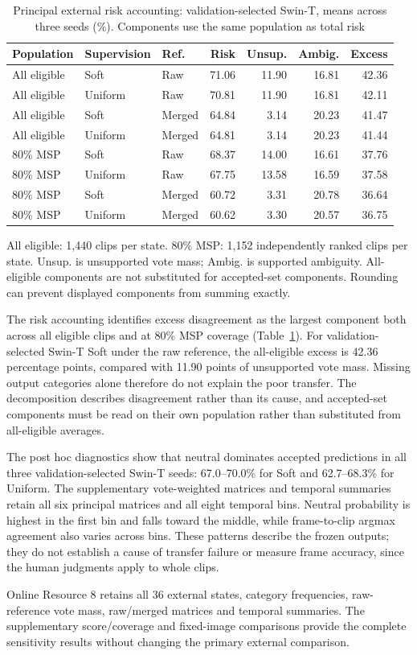 \begin{table}[htbp]
\caption{Principal external risk accounting: validation-selected Swin-T, means across three seeds (\%). Components use the same population as total risk}\label{tab:externalaccounting}
\centering\small\begin{tabular}{lllrrrr}\toprule
Population & Supervision & Ref. & Risk & Unsup. & Ambig. & Excess\\\midrule
All eligible & Soft & Raw & 71.06 & 11.90 & 16.81 & 42.36\\
All eligible & Uniform & Raw & 70.81 & 11.90 & 16.81 & 42.11\\
All eligible & Soft & Merged & 64.84 & 3.14 & 20.23 & 41.47\\
All eligible & Uniform & Merged & 64.81 & 3.14 & 20.23 & 41.44\\
80\% MSP & Soft & Raw & 68.37 & 14.00 & 16.61 & 37.76\\
80\% MSP & Uniform & Raw & 67.75 & 13.58 & 16.59 & 37.58\\
80\% MSP & Soft & Merged & 60.72 & 3.31 & 20.78 & 36.64\\
80\% MSP & Uniform & Merged & 60.62 & 3.30 & 20.57 & 36.75\\
\bottomrule\end{tabular}\par\smallskip
All eligible: 1,440 clips per state. 80\% MSP: 1,152 independently ranked clips per state. Unsup. is unsupported vote mass; Ambig. is supported ambiguity. All-eligible components are not substituted for accepted-set components. Rounding can prevent displayed components from summing exactly.\par
\end{table}

The risk accounting identifies excess disagreement as the largest component both across all eligible clips and at 80\% MSP coverage (Table~\ref{tab:externalaccounting}). For validation-selected Swin-T Soft under the raw reference, the all-eligible excess is 42.36 percentage points, compared with 11.90 points of unsupported vote mass. Missing output categories alone therefore do not explain the poor transfer. The decomposition describes disagreement rather than its cause, and accepted-set components must be read on their own population rather than substituted from all-eligible averages.

The post hoc diagnostics show that neutral dominates accepted predictions in all three validation-selected Swin-T seeds: 67.0--70.0\% for Soft and 62.7--68.3\% for Uniform. The supplementary vote-weighted matrices and temporal summaries retain all six principal matrices and all eight temporal bins. Neutral probability is highest in the first bin and falls toward the middle, while frame-to-clip argmax agreement also varies across bins. These patterns describe the frozen outputs; they do not establish a cause of transfer failure or measure frame accuracy, since the human judgments apply to whole clips.

Online Resource 8 retains all 36 external states, category frequencies, raw-reference vote mass, raw/merged matrices and temporal summaries. The supplementary score/coverage and fixed-image comparisons provide the complete sensitivity results without changing the primary external comparison.
